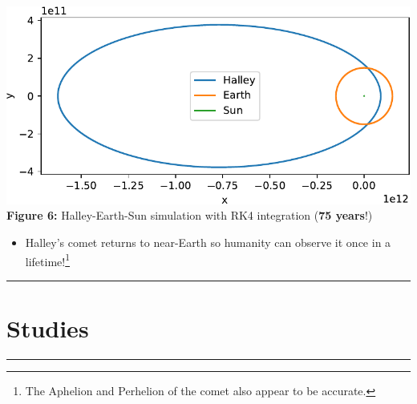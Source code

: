 \documentclass[11pt]{article}
\newcommand{\psection}[1]{{
    \begin{center}
        \noindent \rule{17cm}{0.4pt}
        \section*{\LARGE #1}
        \noindent \rule{17cm}{0.4pt}
    \end{center}
}}
\begin{document}
    \begin{center}
        \includegraphics[scale = 1.1]{images/halley-crop}
        \\ \caption{\textbf{Figure 6:} Halley-Earth-Sun simulation with RK4 integration (\textbf{75 years}!)}
        \label{fig:fig6}
    \end{center}

    \begin{itemize}
        \item Halley's comet returns to near-Earth so humanity can observe it once in a lifetime!\footnote{The Aphelion and Perhelion of the comet also appear to be accurate.}
    \end{itemize}

    \newpage

    \psection{Studies}
\end{document}
